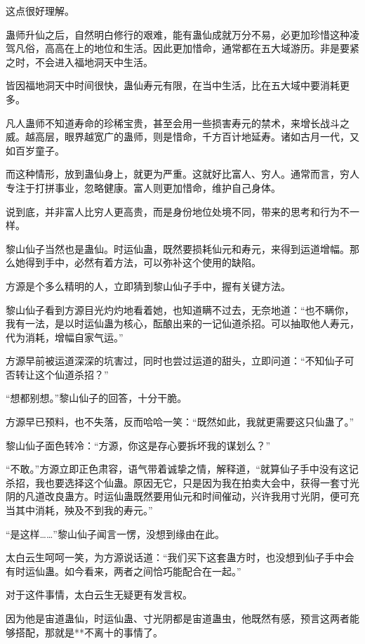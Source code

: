 \begin{this_body}
这点很好理解。

蛊师升仙之后，自然明白修行的艰难，能有蛊仙成就万分不易，必更加珍惜这种凌驾凡俗，高高在上的地位和生活。因此更加惜命，通常都在五大域游历。非是要紧之时，不会进入福地洞天中生活。

皆因福地洞天中时间很快，蛊仙寿元有限，在当中生活，比在五大域中要消耗更多。

凡人蛊师不知道寿命的珍稀宝贵，甚至会用一些损害寿元的禁术，来增长战斗之威。越高层，眼界越宽广的蛊师，则是惜命，千方百计地延寿。诸如古月一代，又如百岁童子。

而这种情形，放到蛊仙身上，就更为严重。这就好比富人、穷人。通常而言，穷人专注于打拼事业，忽略健康。富人则更加惜命，维护自己身体。

说到底，并非富人比穷人更高贵，而是身份地位处境不同，带来的思考和行为不一样。

黎山仙子当然也是蛊仙。时运仙蛊，既然要损耗仙元和寿元，来得到运道增幅。那么她得到手中，必然有着方法，可以弥补这个使用的缺陷。

方源是个多么精明的人，立即猜到黎山仙子手中，握有关键方法。

黎山仙子看到方源目光灼灼地看着她，也知道瞒不过去，无奈地道：“也不瞒你，我有一法，是以时运仙蛊为核心，酝酿出来的一记仙道杀招。可以抽取他人寿元，代为消耗，增幅自家气运。”

方源早前被运道深深的坑害过，同时也尝过运道的甜头，立即问道：“不知仙子可否转让这个仙道杀招？”

“想都别想。”黎山仙子的回答，十分干脆。

方源早已预料，也不失落，反而哈哈一笑：“既然如此，我就更需要这只仙蛊了。”

黎山仙子面色转冷：“方源，你这是存心要拆坏我的谋划么？”

“不敢。”方源立即正色肃容，语气带着诚挚之情，解释道，“就算仙子手中没有这记杀招，我也要选择这个仙蛊。原因无它，只是因为我在拍卖大会中，获得一套寸光阴的凡道改良蛊方。时运仙蛊既然要用仙元和时间催动，兴许我用寸光阴，便可充当其中消耗，殃及不到我的寿元。”

“是这样……”黎山仙子闻言一愣，没想到缘由在此。

太白云生呵呵一笑，为方源说话道：“我们买下这套蛊方时，也没想到仙子手中会有时运仙蛊。如今看来，两者之间恰巧能配合在一起。”

对于这件事情，太白云生无疑更有发言权。

因为他是宙道蛊仙，时运仙蛊、寸光阴都是宙道蛊虫，他既然有感，预言这两者能够搭配，那就是**不离十的事情了。


\end{this_body}
